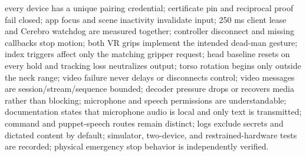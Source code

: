 \markdownRendererUlItem \markdownRendererUntickedBox{} every device has a unique pairing credential;\markdownRendererUlItemEnd 
\markdownRendererUlItem \markdownRendererUntickedBox{} certificate pin and reciprocal proof fail closed;\markdownRendererUlItemEnd 
\markdownRendererUlItem \markdownRendererUntickedBox{} app focus and scene inactivity invalidate input;\markdownRendererUlItemEnd 
\markdownRendererUlItem \markdownRendererUntickedBox{} 250 ms client lease and Cerebro watchdog are measured together;\markdownRendererUlItemEnd 
\markdownRendererUlItem \markdownRendererUntickedBox{} controller disconnect and missing callbacks stop motion;\markdownRendererUlItemEnd 
\markdownRendererUlItem \markdownRendererUntickedBox{} both VR grips implement the intended dead-man gesture;\markdownRendererUlItemEnd 
\markdownRendererUlItem \markdownRendererUntickedBox{} index triggers affect only the matching gripper request;\markdownRendererUlItemEnd 
\markdownRendererUlItem \markdownRendererUntickedBox{} head baseline resets on every hold and tracking loss neutralizes output;\markdownRendererUlItemEnd 
\markdownRendererUlItem \markdownRendererUntickedBox{} torso rotation begins only outside the neck range;\markdownRendererUlItemEnd 
\markdownRendererUlItem \markdownRendererUntickedBox{} video failure never delays or disconnects control;\markdownRendererUlItemEnd 
\markdownRendererUlItem \markdownRendererUntickedBox{} video messages are session/stream/sequence bounded;\markdownRendererUlItemEnd 
\markdownRendererUlItem \markdownRendererUntickedBox{} decoder pressure drops or recovers media rather than blocking;\markdownRendererUlItemEnd 
\markdownRendererUlItem \markdownRendererUntickedBox{} microphone and speech permissions are understandable;\markdownRendererUlItemEnd 
\markdownRendererUlItem \markdownRendererUntickedBox{} documentation states that microphone audio is local and only text is transmitted;\markdownRendererUlItemEnd 
\markdownRendererUlItem \markdownRendererUntickedBox{} command and puppet-speech routes remain distinct;\markdownRendererUlItemEnd 
\markdownRendererUlItem \markdownRendererUntickedBox{} logs exclude secrets and dictated content by default;\markdownRendererUlItemEnd 
\markdownRendererUlItem \markdownRendererUntickedBox{} simulator, two-device, and restrained-hardware tests are recorded;\markdownRendererUlItemEnd 
\markdownRendererUlItem \markdownRendererUntickedBox{} physical emergency stop behavior is independently verified.\markdownRendererUlItemEnd 
\markdownRendererUlEnd \markdownRendererInterblockSeparator
{}
\markdownRendererSectionEnd \markdownRendererSectionBegin
